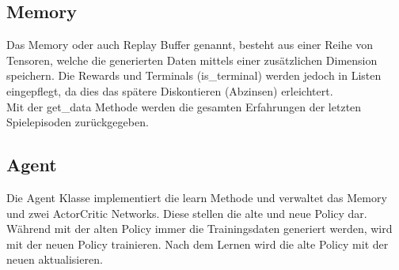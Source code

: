 \subsection{Memory} \label{subsec:Implementierung_Memory_PPO}
Das Memory oder auch Replay Buffer genannt, besteht aus einer Reihe von Tensoren, welche die generierten Daten mittels einer zusätzlichen Dimension speichern. Die Rewards und Terminals (is\_terminal) werden jedoch in Listen eingepflegt, da dies das spätere Diskontieren (Abzinsen) erleichtert.\\
Mit der get\_data Methode werden die gesamten Erfahrungen der letzten Spielepisoden zurückgegeben. 

\subsection{Agent} \label{subsec:Implementierung_PPO_Agent}
Die Agent Klasse implementiert die learn Methode und verwaltet das Memory und zwei ActorCritic Networks. Diese stellen die alte und neue Policy dar. Während mit der alten Policy immer die Trainingsdaten generiert werden, wird mit der neuen Policy trainieren. Nach dem Lernen wird die alte Policy mit der neuen aktualisieren.

